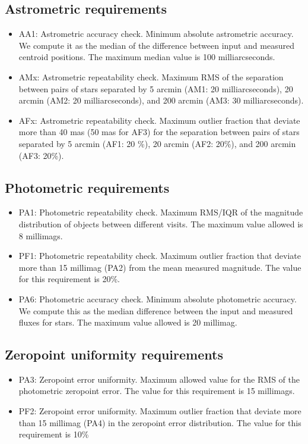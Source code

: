 \documentclass[\docopts]{\docclass}
\begin{document}
\subsection{Astrometric requirements}
\begin{itemize}
\item AA1: Astrometric accuracy check. Minimum absolute astrometric accuracy. We compute it as the median of the difference between input and measured centroid positions. The maximum median value is 100 milliarcseconds.
\item AMx: Astrometric repeatability check. Maximum RMS of the separation between pairs of stars separated by 5 arcmin (AM1: 20 milliarcseconds), 20 arcmin (AM2: 20 milliarcseconds), and 200 arcmin (AM3: 30 milliarcseconds). 
\item AFx: Astrometric repeatability check. Maximum outlier fraction that deviate more than 40 mas (50 mas for AF3) for the separation between pairs of stars separated by 5 arcmin (AF1: 20 \%), 20 arcmin (AF2: 20\%), and 200 arcmin (AF3: 20\%).
\end{itemize} 

\subsection{Photometric requirements}
\begin{itemize}
\item PA1: Photometric repeatability check. Maximum RMS/IQR of the magnitude distribution of objects between different visits. The maximum value allowed is 8 millimags.
\item PF1: Photometric repeatability check. Maximum outlier fraction that deviate more than 15 millimag (PA2) from the mean measured magnitude. The value for this requirement is 20\%. 
\item PA6: Photometric accuracy check. Minimum absolute photometric accuracy. We compute this as the median difference between the input and measured fluxes for stars. The maximum value allowed is 20 millimag.
\end{itemize}

\subsection{Zeropoint uniformity requirements}
\begin{itemize}
\item PA3: Zeropoint error uniformity. Maximum allowed value for the RMS of the photometric zeropoint error. The value for this requirement is 15 millimags.
\item PF2: Zeropoint error uniformity. Maximum outlier fraction that deviate more than 15 millimag (PA4) in the zeropoint error distribution. The value for this requirement is 10\%
\end{itemize}
\end{document}
